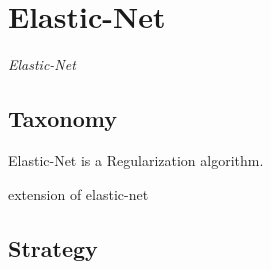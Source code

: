 
\section{Elastic-Net} 
\label{sec:elasticnet}

\emph{Elastic-Net}

\subsection{Taxonomy}
Elastic-Net is a Regularization algorithm.

extension of elastic-net


\subsection{Strategy}


